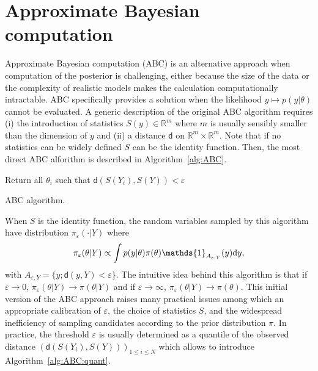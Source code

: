 \documentclass[english,graybox,envcountchap,envcountsame,sectrefs,shortlabels]{svmono}
\theoremstyle{style}
\newcommand{\eqsp}{}
\begin{document}
\section{Approximate Bayesian computation}
Approximate Bayesian computation (ABC) is an alternative approach when computation of the posterior is challenging, either because the size of the data or the complexity of realistic models makes the calculation computationally intractable. ABC specifically provides a solution  when the likelihood $y\mapsto p(y|\theta)$ cannot be evaluated. A generic description of the original ABC algorithm requires (i) the introduction of statistics $S(y)\in\mathbb{R}^m$ where $m$ is usually sensibly smaller than the dimension of $y$ and (ii) a distance $\mathsf{d}$ on $\mathbb{R}^m\times \mathbb{R}^m$. Note that if no statistics can be widely defined $S$ can be the identity function. Then, the most direct ABC alforithm is described in Algorithm~\ref{alg:ABC}.

\medskip

\begin{algorithm}[H] \label{alg:ABC}
Return all $\theta_i$ such that $\mathsf{d}(S(Y_i),S(Y))<\varepsilon$\;
\caption{ABC algorithm.}
\end{algorithm}

\medskip

When $S$ is the identity function, the random variables sampled by this  algorithm have distribution $\pi_{\varepsilon}(\cdot |Y)$ where
$$
\pi_{\varepsilon}(\theta|Y)\propto \int p(y|\theta)\pi(\theta) \mathds{1}_{A_{\varepsilon,Y}}(y)\rmd y\eqsp,
$$
with $A_{\varepsilon,Y} = \{y\eqsp;\mathsf{d}(y,Y)<\varepsilon\eqsp\}$. The intuitive idea behind this algorithm is that if  $\varepsilon \to 0$, $\pi_{\varepsilon}(\theta|Y) \to \pi(\theta|Y)$ and if $\varepsilon \to \infty$, $\pi_{\varepsilon}(\theta|Y) \to \pi(\theta)$. This initial version of the ABC approach raises many practical  issues among which an appropriate calibration of $\varepsilon$, the choice of statistics $S$, and the widespread inefficiency of sampling candidates according to the prior distribution $\pi$. In practice, the threshold $\varepsilon$ is usually determined as a quantile of the observed distance $(\mathsf{d}(S(Y_i),S(Y)))_{1\leqslant i \leqslant N}$ which allows to introduce Algorithm~\ref{alg:ABC:quant}.
\end{document}
